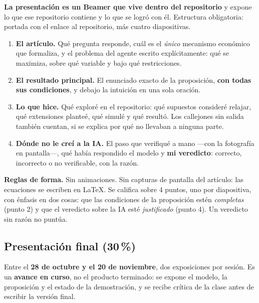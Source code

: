 \documentclass[11pt]{article}
\begin{document}
\textbf{La presentaci\'on es un Beamer que vive dentro del repositorio} y expone lo que ese repositorio contiene y lo que se logr\'o con \'el. Estructura obligatoria: portada con el enlace al repositorio, m\'as cuatro diapositivas.

\begin{enumerate}
\item \textbf{El art\'iculo.} Qu\'e pregunta responde, cu\'al es el \emph{\'unico} mecanismo econ\'omico que formaliza, y el problema del agente escrito expl\'icitamente: qu\'e se maximiza, sobre qu\'e variable y bajo qu\'e restricciones.
\item \textbf{El resultado principal.} El enunciado exacto de la proposici\'on, \textbf{con todas sus condiciones}, y debajo la intuici\'on en una sola oraci\'on.
\item \textbf{Lo que hice.} Qu\'e explor\'e en el repositorio: qu\'e supuestos consider\'e relajar, qu\'e extensiones plante\'e, qu\'e simul\'e y qu\'e result\'o. Los callejones sin salida tambi\'en cuentan, si se explica por qu\'e no llevaban a ninguna parte.
\item \textbf{D\'onde no le cre\'i a la IA.} El paso que verifiqu\'e a mano ---con la fotograf\'ia en pantalla---, qu\'e hab\'ia respondido el modelo y \textbf{mi veredicto}: correcto, incorrecto o no verificable, con la raz\'on.
\end{enumerate}

\textbf{Reglas de forma.} Sin animaciones. Sin capturas de pantalla del art\'iculo: las ecuaciones se escriben en \LaTeX. Se califica sobre 4 puntos, uno por diapositiva, con \'enfasis en dos cosas: que las condiciones de la proposici\'on est\'en \emph{completas} (punto 2) y que el veredicto sobre la IA est\'e \emph{justificado} (punto 4). Un veredicto sin raz\'on no punt\'ua.

\subsection*{Presentaci\'on final (30\,\%)}

Entre el \textbf{28 de octubre y el 20 de noviembre}, dos exposiciones por sesi\'on. Es un \textbf{avance en curso}, no el producto terminado: se expone el modelo, la proposici\'on y el estado de la demostraci\'on, y se recibe cr\'itica de la clase antes de escribir la versi\'on final.

\end{document}
